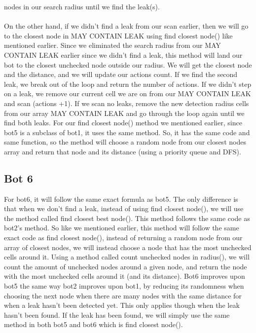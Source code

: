 \documentclass[12pt]{article}
\begin{document}
nodes in our search radius until we find the leak(s).  
\\
\\
On the other hand, if we didn't find a leak from our scan earlier, then we will go to the closest node in 
MAY CONTAIN LEAK using find closest node() like mentioned earlier. Since we eliminated the search radius from 
our MAY CONTAIN LEAK earlier since we didn't find a leak, this method will land our bot to the closest unchecked 
node outside our radius. We will get the closest node and the distance, and we will update our actions count. 
If we find the second leak, we break out of the loop and return the number of actions. If we didn't step on a leak, 
we remove our current cell we are on from our MAY CONTAIN LEAK and scan (actions +1). If we scan no leaks, 
remove the new detection radius cells from our array MAY CONTAIN LEAK and go through the loop again until we 
find both leaks. For our find closest node() method we mentioned earlier, since bot5 is a subclass of bot1,
 it uses the same method. So, it has the same code and same function, so the method will choose a random node 
 from our closest nodes array and return that node and its distance (using a priority queue and DFS).  

\subsection*{Bot 6}
For bot6, it will follow the same exact formula as bot5. The only difference is that when we don't find a 
leak, instead of using find closest node(), we will use the method called find closest best node(). 
This method follows the same code as bot2's method. So like we mentioned earlier, this method will follow 
the same exact code as find closest node(), instead of returning a random node from our array of closest 
nodes, we will instead choose a node that has the most unchecked cells around it. Using a method called 
count unchecked nodes in radius(), we will count the amount of unchecked nodes around a given node, and 
return the node with the most unchecked cells around it (and its distance). Bot6 improves upon bot5 the
 same way bot2 improves upon bot1, by reducing its randomness when choosing the next node when there are many 
 nodes with the same distance for when a leak hasn't been detected yet. This only applies though when the leak 
 hasn't been found. If the leak has been found, we will simply use the same method in both bot5 and bot6 which 
 is find closest node(). 
\end{document}

